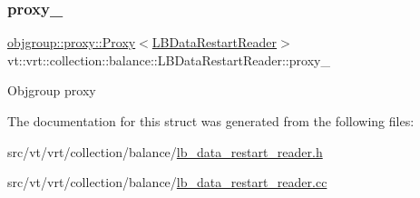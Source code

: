\subsubsection{\texorpdfstring{proxy\+\_\+}{proxy\_}}
{\footnotesize\ttfamily \hyperlink{structvt_1_1objgroup_1_1proxy_1_1_proxy}{objgroup\+::proxy\+::\+Proxy}$<$\hyperlink{structvt_1_1vrt_1_1collection_1_1balance_1_1_l_b_data_restart_reader}{L\+B\+Data\+Restart\+Reader}$>$ vt\+::vrt\+::collection\+::balance\+::\+L\+B\+Data\+Restart\+Reader\+::proxy\+\_\+\hspace{0.3cm}{\ttfamily [private]}}

Objgroup proxy 

The documentation for this struct was generated from the following files\+:\begin{DoxyCompactItemize}
\item 
src/vt/vrt/collection/balance/\hyperlink{lb__data__restart__reader_8h}{lb\+\_\+data\+\_\+restart\+\_\+reader.\+h}\item 
src/vt/vrt/collection/balance/\hyperlink{lb__data__restart__reader_8cc}{lb\+\_\+data\+\_\+restart\+\_\+reader.\+cc}\end{DoxyCompactItemize}
